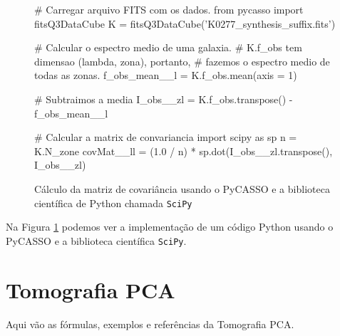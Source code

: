 \begin{figure}
\begin{python}
# Carregar arquivo FITS com os dados.
from pycasso import fitsQ3DataCube
K = fitsQ3DataCube('K0277_synthesis_suffix.fits')

# Calcular o espectro medio de uma galaxia. 
# K.f_obs tem dimensao (lambda, zona), portanto, 
# fazemos o espectro medio de todas as zonas.
f_obs_mean__l = K.f_obs.mean(axis = 1)

# Subtraimos a media
I_obs__zl = K.f_obs.transpose() - f_obs_mean__l

# Calcular a matrix de convariancia
import scipy as sp
n = K.N_zone
covMat__ll = (1.0 / n) * sp.dot(I_obs__zl.transpose(), I_obs__zl) 

\end{python}
	\caption[Exemplo de cálculo da matriz de covariância usando o PyCASSO]
	{Cálculo da matriz de covariância usando o PyCASSO e a biblioteca científica
	de Python chamada \texttt{SciPy}}
	\label{fig:PCA:covMatrix}
\end{figure}

Na Figura \ref{fig:PCA:covMatrix} podemos ver a implementação de um código
Python usando o PyCASSO e a biblioteca científica \texttt{SciPy}.


\section{Tomografia PCA}
\label{sec:PCAeTomoPCA:TomoPCA}
\ojo
Aqui vão as fórmulas, exemplos e referências da Tomografia PCA.

